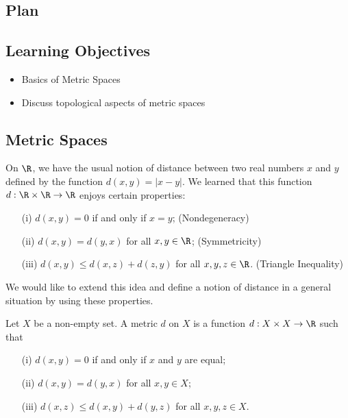 \subsection{Plan}


\subsection{Learning Objectives}

\begin{itemize}
    \item Basics of Metric Spaces
    \item Discuss topological aspects of metric spaces
\end{itemize}

\subsection{Metric Spaces}

On \( \R  \), we have the usual notion of distance between two real numbers \( x  \) and \( y  \) defined by the function \( d(x,y) = | x - y  |  \). We learned that this function \( d: \R \times \R \to \R  \) enjoys certain properties:
\begin{enumerate}
    \item[(i)] \( d(x,y) = 0  \) if and only if \( x = y  \); (Nondegeneracy)
    \item[(ii)] \( d(x,y) = d(y,x) \) for all \( x,y \in \R  \); (Symmetricity)
    \item[(iii)] \( d(x,y) \leq d(x,z) + d(z,y) \) for all \( x,y,z \in \R  \). (Triangle Inequality)
\end{enumerate}

We would like to extend this idea and define a notion of distance in a general situation by using these properties.

\begin{definition}[Metric]
    Let \( X  \) be a non-empty set. A metric \( d  \) on \( X  \) is a function \( d: X \times X \to \R  \) such that 
    \begin{enumerate}
        \item[(i)] \( d(x,y) = 0  \) if and only if \( x \) and \( y  \) are equal;
        \item[(ii)] \( d(x,y) = d(y,x) \) for all \( x,y \in X  \);
        \item[(iii)] \( d(x,z) \leq d(x,y) + d(y,z) \) for all \( x,y, z \in X  \).
    \end{enumerate}
\end{definition}


